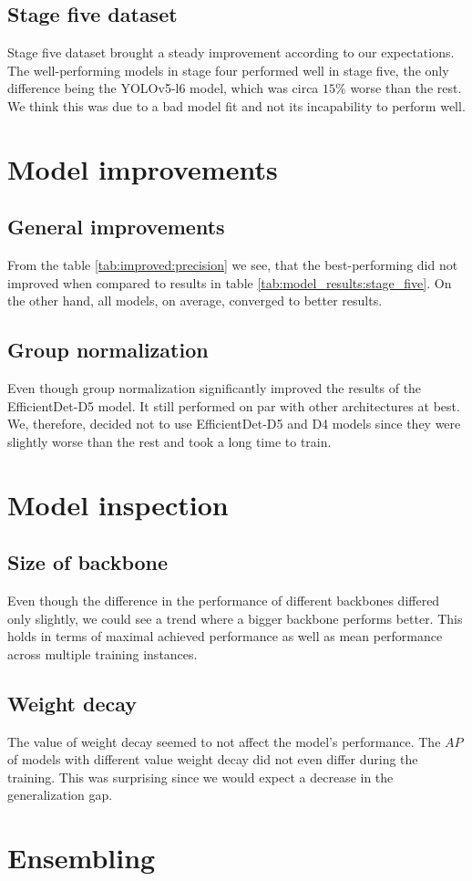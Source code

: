 \subsection{Stage five dataset}

Stage five dataset brought a steady improvement according to our expectations. The well-performing models in stage four performed well in stage five, the only difference being the YOLOv5-l6 model, which was circa $15\%$ worse than the rest. We think this was due to a bad model fit and not its incapability to perform well.

\section{Model improvements}
\subsection{General improvements}
From the table \ref{tab:improved:precision} we see, that the best-performing did not improved when compared to results in table \ref{tab:model_results:stage_five}. On the other hand, all models, on average, converged to better results.

\subsection{Group normalization}
Even though group normalization significantly improved the results of the EfficientDet-D5 model. It still performed on par with other architectures at best. We, therefore, decided not to use EfficientDet-D5 and D4 models since they were slightly worse than the rest and took a long time to train.

\section{Model inspection}
\subsection{Size of backbone}
Even though the difference in the performance of different backbones differed only slightly, we could see a trend where a bigger backbone performs better. This holds in terms of maximal achieved performance as well as mean performance across multiple training instances.

\subsection{Weight decay}
The value of weight decay seemed to not affect the model's performance. The $AP$ of models with different value weight decay did not even differ during the training. This was surprising since we would expect a decrease in the generalization gap.

\section{Ensembling}



